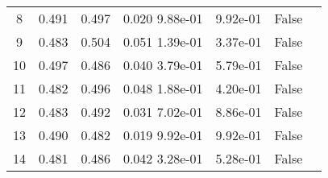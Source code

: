 \begin{tabular}{c|c|c|c|c|c|c}
  8 & 0.491 &   0.497 &   0.020   9.88e-01 &   9.92e-01 &  False\\
  9 & 0.483 &   0.504 &   0.051   1.39e-01 &   3.37e-01 &  False\\
 10 & 0.497 &   0.486 &   0.040   3.79e-01 &   5.79e-01 &  False\\
 11 & 0.482 &   0.496 &   0.048   1.88e-01 &   4.20e-01 &  False\\
 12 & 0.483 &   0.492 &   0.031   7.02e-01 &   8.86e-01 &  False\\
 13 & 0.490 &   0.482 &   0.019   9.92e-01 &   9.92e-01 &  False\\
 14 & 0.481 &   0.486 &   0.042   3.28e-01 &   5.28e-01 &  False\\
\end{tabular}